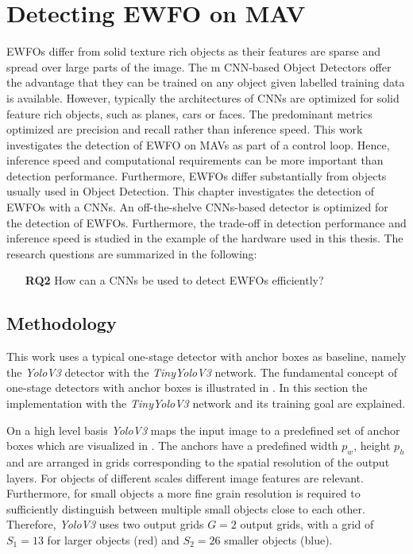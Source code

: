 	\chapter{Detecting \ac{EWFO} on \ac{MAV}}
	\label{sec:object_detection}
	
	\acp{EWFO} differ from solid texture rich objects as their features are sparse and spread over large parts of the image. The m
	\ac{CNN}-based Object Detectors offer the advantage that they can be trained on any object given labelled training data is available. However, typically the architectures of \acp{CNN} are optimized for solid feature rich objects, such as planes, cars or faces. The predominant metrics optimized are precision and recall rather than inference speed. This work investigates the detection of \ac{EWFO} on \acp{MAV} as part of a control loop. Hence, inference speed and computational requirements can be more important than detection performance. Furthermore, \acp{EWFO} differ substantially from objects usually used in Object Detection. This chapter investigates the detection of \acp{EWFO} with a \acp{CNN}. An off-the-shelve \acp{CNN}-based detector is optimized for the detection of \acp{EWFO}. Furthermore, the trade-off in detection performance and inference speed is studied in the example of the hardware used in this thesis. The research questions are summarized in the following:
	
\begin{enumerate}
	\item[\textbf{RQ2}]How can a \acp{CNN} be used to detect \acp{EWFO} efficiently?
	
\end{enumerate}

	\section{Methodology}
		
	This work uses a typical one-stage detector with anchor boxes as baseline, namely the \textit{YoloV3} detector with the \textit{TinyYoloV3} network. The fundamental concept of one-stage detectors with anchor boxes is illustrated in . In this section the implementation with the \textit{TinyYoloV3} network and its training goal are explained.
	
	On a high level basis \textit{YoloV3} maps the input image to a predefined set of anchor boxes which are visualized in . The anchors have a predefined width $p_w$, height $p_h$ and are arranged in grids corresponding to the spatial resolution of the output layers. For objects of different scales different image features are relevant. Furthermore, for small objects a more fine grain resolution is required to sufficiently distinguish between multiple small objects close to each other. Therefore, \textit{YoloV3} uses two output grids $G=2$ output grids, with a grid of $S_1 =13$ for larger objects (red) and $S_2 = 26$ smaller objects (blue). 
	
